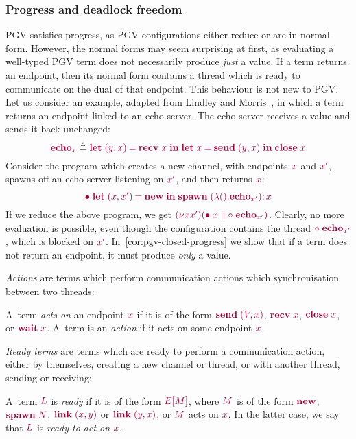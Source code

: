 \documentclass[main.tex]{subfiles}
\begin{document}
\subsubsection*{Progress and deadlock freedom}
PGV satisfies progress, as PGV configurations either reduce or are in normal form. However, the normal forms may seem surprising at first, as evaluating a well-typed PGV term does not necessarily produce \emph{just} a value. If a term returns an endpoint, then its normal form contains a thread which is ready to communicate on the dual of that endpoint. This behaviour is not new to PGV. Let us consider an example, adapted from Lindley and Morris~\cite{lindleymorris15}, in which a term returns an endpoint linked to an echo server. The echo server receives a value and sends it back unchanged:
\[
  \tm{\echo_x} \defeq \tm{\letpair{y}{x}{\recv\;{x}}{\letbind{x}{\send\;\pair{y}{x}}{\close\;x}}}
\]
Consider the program which creates a new channel, with endpoints $\tm{x}$ and $\tm{x'}$, spawns off an echo server listening on $\tm{x'}$, and then returns $\tm{x}$:
\[
  \tm{\main\;\letpair{x}{x'}{\new}{\andthen{\spawn\;(\lambda\unit.\echo_{x'})}}{x}}
\]
If we reduce the above program, we get $\tm{\res{x}{x'}{(\ppar{\main\;x}{\child\;\echo_{x'}})}}$. Clearly, no more evaluation is possible, even though the configuration contains the thread $\tm{\child\;\echo_{x'}}$, which is blocked on $\tm{x'}$. In~\cref{cor:pgv-closed-progress} we show that if a term does not return an endpoint, it must produce \emph{only} a value.

\emph{Actions} are terms which perform communication actions which synchronisation between two threads:
\begin{definition}[Actions]
  \label{def:pgv-actions}
  A~term \emph{acts on} an endpoint $\tm{x}$ if it is of the form $\tm{\send\;\pair{V}{x}}$, $\tm{\recv\;{x}}$, $\tm{\close\;{x}}$, or $\tm{\wait\;{x}}$. A~term is an \emph{action} if it acts on some endpoint $\tm{x}$.
\end{definition}

\emph{Ready terms} are terms which are ready to perform a communication action, either by themselves, \eg creating a new channel or thread, or with another thread, \eg sending or receiving:
\begin{definition}
  \label{def:pgv-ready-actions}
  A~term $\tm{L}$ is \emph{ready} if it is of the form $\tm{\plug{E}{M}}$, where $\tm{M}$ is of the form $\tm{\new}$, $\tm{\spawn\;N}$, $\tm{\link\;\pair{x}{y}}$ or $\tm{\link\;\pair{y}{x}}$, or $\tm{M}$ acts on $\tm{x}$. In the latter case, we say that $\tm{L}$ is \emph{ready to act on} $\tm{x}$.
\end{definition}
\end{document}
